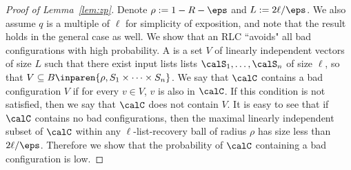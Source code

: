 \documentclass{article}
\begin{document}
\begin{proof}[Proof of Lemma~\ref{lem:zp}]
    Denote $\rho := 1-R-\eps$ and $L := 2\ell/\eps$.
    We also assume $q$ is a multiple of $\ell$ for simplicity of exposition, and note that the result holds in the general case as well.
    We show that an RLC ``avoids" all bad configurations with high probability.
    A  is a set $V$ of linearly independent vectors of size $L$ such that there exist input lists lists $\calS_1, \ldots, \calS_n$ of size $\ell$, so that $V \subseteq B\inparen{ \rho, S_1 \times  \cdots \times S_n}$.
    We say that $\calC$ contains a bad configuration $V$ if for every $v \in V$, $v$ is also in $\calC$. If this condition is not satisfied, then we say that $\calC$ does not contain $V$.
    It is easy to see that if $\calC$ contains no bad configurations, then the maximal linearly independent subset of $\calC$ within any $\ell$-list-recovery ball of radius $\rho$ has size less than $2\ell/\eps$.
    Therefore we show that the probability of $\calC$ containing a bad configuration is low.


\end{proof}
\end{document}
